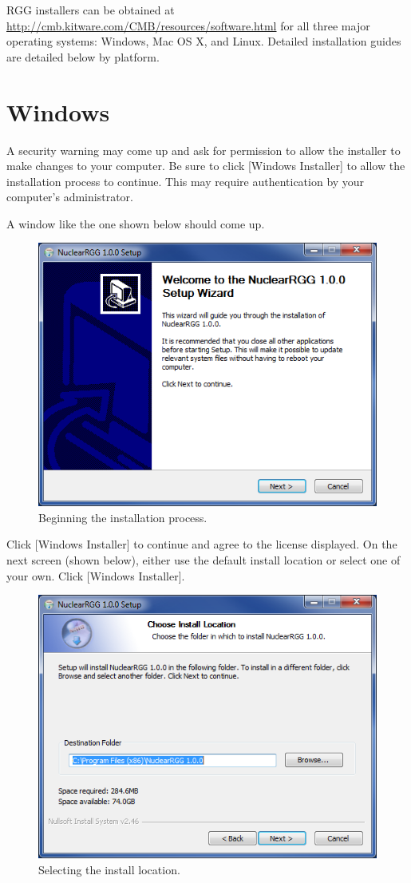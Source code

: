 RGG installers can be obtained at \url{http://cmb.kitware.com/CMB/resources/software.html} for all three major operating systems: Windows, Mac OS X, and Linux.  Detailed installation guides are detailed below by platform.

\section{Windows}
A security warning may come up and ask for permission to allow the installer to make changes to your computer.  Be sure to click [Windows Installer] to allow the installation process to continue.  This may require authentication by your computer's administrator.

A window like the one shown below should come up.

\begin{figure}[H]
	\begin{center}
		\includegraphics[width=0.5\linewidth]{Images/windows-install-1.png}
		\caption{Beginning the installation process.}
		\label{fig:WindowsInstall1}
	\end{center}
\end{figure}

Click [Windows Installer] to continue and agree to the license displayed.  On the next screen (shown below), either use the default install location or select one of your own.  Click [Windows Installer].

\begin{figure}[H]
	\begin{center}
		\includegraphics[width=0.5\linewidth]{Images/windows-install-2.png}
		\caption{Selecting the install location.}
		\label{fig:WindowsInstall2}
	\end{center}
\end{figure}

